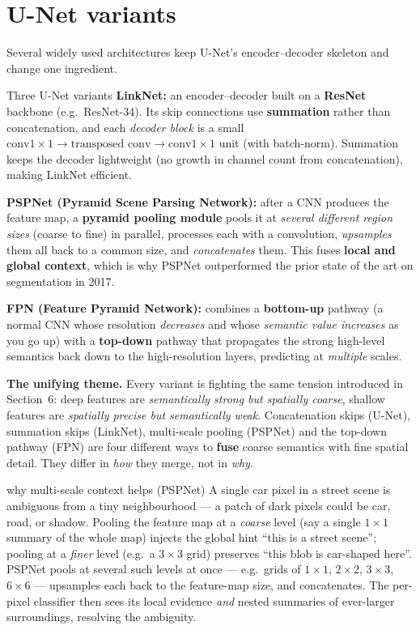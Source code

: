 \documentclass{report}
\begin{document}
\section{U-Net variants}

Several widely used architectures keep U-Net's encoder--decoder skeleton and
change one ingredient.

\begin{defbox}{Three U-Net variants}
\textbf{LinkNet:} an encoder--decoder built on a \textbf{ResNet} backbone (e.g.\
ResNet-34). Its skip connections use \textbf{summation} rather than
concatenation, and each \emph{decoder block} is a small
$\text{conv}1\times1 \to \text{transposed conv} \to \text{conv}1\times1$ unit
(with batch-norm). Summation keeps the decoder lightweight (no growth in channel
count from concatenation), making LinkNet efficient.

\medskip
\textbf{PSPNet (Pyramid Scene Parsing Network):} after a CNN produces the
feature map, a \textbf{pyramid pooling module} pools it at \emph{several
different region sizes} (coarse to fine) in parallel, processes each with a
convolution, \emph{upsamples} them all back to a common size, and
\emph{concatenates} them. This fuses \textbf{local and global context}, which is
why PSPNet outperformed the prior state of the art on segmentation in 2017.

\medskip
\textbf{FPN (Feature Pyramid Network):} combines a \textbf{bottom-up} pathway (a
normal CNN whose resolution \emph{decreases} and whose \emph{semantic value
increases} as you go up) with a \textbf{top-down} pathway that propagates the
strong high-level semantics back down to the high-resolution layers, predicting
at \emph{multiple} scales.
\end{defbox}

\begin{keybox}
\textbf{The unifying theme.} Every variant is fighting the same tension
introduced in Section~6: deep features are \emph{semantically strong but
spatially coarse}, shallow features are \emph{spatially precise but semantically
weak}. Concatenation skips (U-Net), summation skips (LinkNet), multi-scale
pooling (PSPNet) and the top-down pathway (FPN) are four different ways to
\textbf{fuse} coarse semantics with fine spatial detail. They differ in
\emph{how} they merge, not in \emph{why}.
\end{keybox}

\begin{exbox}{why multi-scale context helps (PSPNet)}
A single car pixel in a street scene is ambiguous from a tiny neighbourhood --- a
patch of dark pixels could be car, road, or shadow. Pooling the feature map at a
\emph{coarse} level (say a single $1\times1$ summary of the whole map) injects
the global hint ``this is a street scene''; pooling at a \emph{finer} level
(e.g.\ a $3\times3$ grid) preserves ``this blob is car-shaped here''. PSPNet
pools at several such levels at once --- e.g.\ grids of $1\times1$, $2\times2$,
$3\times3$, $6\times6$ --- upsamples each back to the feature-map size, and
concatenates. The per-pixel classifier then sees its local evidence \emph{and}
nested summaries of ever-larger surroundings, resolving the ambiguity.
\end{exbox}
\end{document}
